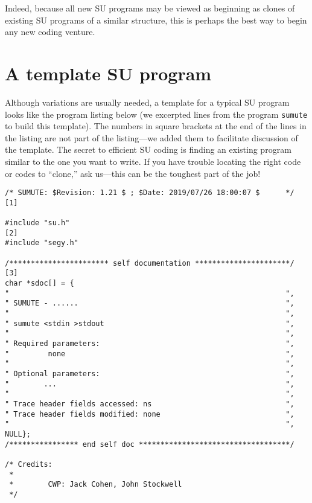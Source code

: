 {{{{{{{Indeed, because all new SU programs may be viewed as beginning as clones of existing SU
programs of a similar structure, this is perhaps the best way to begin any new coding
venture.


\section {A template SU program\label{SU:sec:template}}
Although variations are usually needed, a template for a typical {\small\sf SU} program
looks like the program listing below (we excerpted lines from the program {\tt sumute} to 
build this template).  The numbers in square brackets at the end of the lines in the 
listing are not part of the listing---we added them to facilitate discussion of the 
template.  The secret to efficient {\small\sf SU} coding is finding an existing program 
similar to the one you want to write.  If you have trouble locating the right code or 
codes to ``clone,'' ask us---this can be the toughest part of the job!
 
{\small\begin{verbatim}
/* SUMUTE: $Revision: 1.21 $ ; $Date: 2019/07/26 18:00:07 $      */  [1]

#include "su.h"                                                     [2]
#include "segy.h"

/*********************** self documentation **********************/ [3]
char *sdoc[] = {
"                                                                ",
" SUMUTE - ......                                                ",
"                                                                ",
" sumute <stdin >stdout                                          ",
"                                                                ",
" Required parameters:                                           ",
"         none                                                   ",
"                                                                ",
" Optional parameters:                                           ",
"        ...                                                     ",
"                                                                ",
" Trace header fields accessed: ns                               ",
" Trace header fields modified: none                             ",
"                                                                ",
NULL};
/**************** end self doc ***********************************/

/* Credits:
 *
 *        CWP: Jack Cohen, John Stockwell
 */



\end{verbatim}}}}}}}}}
